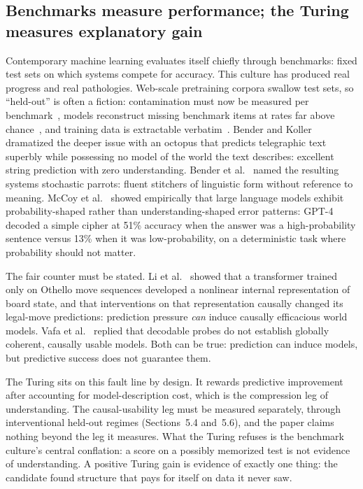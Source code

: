 \documentclass[11pt]{article}
\begin{document}
\subsection{Benchmarks measure performance; the Turing measures explanatory gain}

Contemporary machine learning evaluates itself chiefly through benchmarks: fixed test sets on which systems compete for accuracy. This culture has produced real progress and real pathologies. Web-scale pretraining corpora swallow test sets, so ``held-out'' is often a fiction: contamination must now be measured per benchmark~\cite{sainz2023}, models reconstruct missing benchmark items at rates far above chance~\cite{deng2024}, and training data is extractable verbatim~\cite{carlini2021}. Bender and Koller~\cite{benderkoller2020} dramatized the deeper issue with an octopus that predicts telegraphic text superbly while possessing no model of the world the text describes: excellent string prediction with zero understanding. Bender et al.~\cite{benderetal2021} named the resulting systems stochastic parrots: fluent stitchers of linguistic form without reference to meaning. McCoy et al.~\cite{mccoy2024} showed empirically that large language models exhibit probability-shaped rather than understanding-shaped error patterns: GPT-4 decoded a simple cipher at 51\% accuracy when the answer was a high-probability sentence versus 13\% when it was low-probability, on a deterministic task where probability should not matter.

The fair counter must be stated. Li et al.~\cite{li2023} showed that a transformer trained only on Othello move sequences developed a nonlinear internal representation of board state, and that interventions on that representation causally changed its legal-move predictions: prediction pressure \textit{can} induce causally efficacious world models. Vafa et al.~\cite{vafa2024} replied that decodable probes do not establish globally coherent, causally usable models. Both can be true: prediction can induce models, but predictive success does not guarantee them.

The Turing sits on this fault line by design. It rewards predictive improvement after accounting for model-description cost, which is the compression leg of understanding. The causal-usability leg must be measured separately, through interventional held-out regimes (Sections~5.4 and~5.6), and the paper claims nothing beyond the leg it measures. What the Turing refuses is the benchmark culture's central conflation: a score on a possibly memorized test is not evidence of understanding. A positive Turing gain is evidence of exactly one thing: the candidate found structure that pays for itself on data it never saw.
\end{document}
